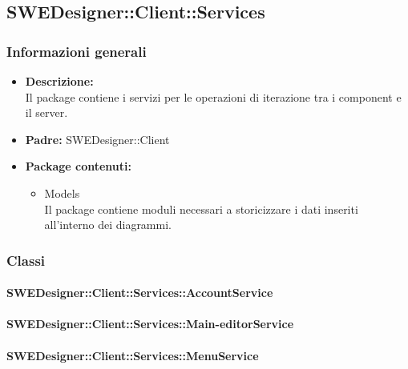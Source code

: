 	\subsection{SWEDesigner::Client::Services}
		\subsubsection{Informazioni generali}
			\begin{itemize}
          		\item \textbf{Descrizione:}\\
          		Il package contiene i servizi per le operazioni di iterazione tra i component e il server.
          		\item \textbf{Padre:} SWEDesigner::Client
          		\item \textbf{Package contenuti:}\\
          		\begin{itemize}
          			\item Models\\
          			Il package contiene moduli necessari a storicizzare i dati inseriti all’interno dei diagrammi.
          		\end{itemize}
          	\end{itemize}
          	
          \subsubsection{Classi}
          
          	\paragraph{SWEDesigner::Client::Services::AccountService}
				
				
			\paragraph{SWEDesigner::Client::Services::Main-editorService}
				
				
			\paragraph{SWEDesigner::Client::Services::MenuService}
				
